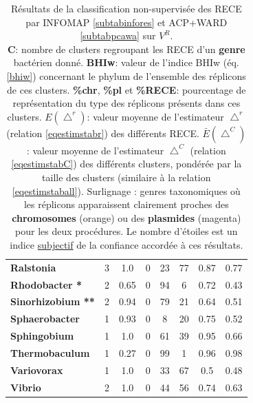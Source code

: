 \begin{landscape}
\begin{small}
\begin{table}[h]
\begin{minipage}[t]{0.45\linewidth}
\begin{tabular}{>{\bfseries}l|c|c|ccc|c|c}
Ralstonia&3&1.0&0&23&77&0.87&0.77\\
\rowcolor{Cpl}Rhodobacter *&2&0.65&0&94&6&0.72&0.43\\
\rowcolor{Cpl}Sinorhizobium **&2&0.94&0&79&21&0.64&0.51\\
Sphaerobacter&1&0.93&0&8&20&0.75&0.52\\
Sphingobium&1&1.0&0&61&39&0.95&0.66\\
Thermobaculum&1&0.27&0&99&1&0.96&0.98\\
Variovorax&1&1.0&0&33&67&0.5&0.48\\
Vibrio&2&1.0&0&44&56&0.74&0.63\\
	  \end{tabular}
	  \label{subtabpcawa}
	  \end{minipage}
	  \caption[Classification non-supervisée des RECE]{Résultats de la classification non-supervisée des RECE par INFOMAP \ref{subtabinfores} et ACP+WARD \ref{subtabpcawa} sur $V^{R}$. \\
 \textbf{C}: nombre de clusters regroupant les RECE d'un \textbf{genre} bactérien donné. \textbf{BHIw}: valeur de l'indice BHIw (éq. \ref{bhiw}) concernant le phylum de l'ensemble des réplicons de ces clusters. \textbf{\%chr}, \textbf{\%pl} et \textbf{\%RECE}: pourcentage de représentation du type des réplicons présents dans ces clusters. $E(\bigtriangleup^{r})$: valeur moyenne de l'estimateur $\bigtriangleup^{r}$ (relation \ref{eqestimstabr}) des différents RECE. $\bar{E}(\bigtriangleup^{C})$: valeur moyenne de l'estimateur $\bigtriangleup^{C}$ (relation \ref{eqestimstabC}) des différents clusters, pondérée par la taille des clusters (similaire à la relation \ref{eqestimstaball}). Surlignage : genres taxonomiques où les réplicons apparaissent clairement proches des \textbf{chromosomes} (orange) ou des \textbf{plasmides} (magenta) pour les deux procédures. Le nombre d'étoiles est un indice \underline{subjectif} de la confiance accordée à ces résultats.}\label{tabrececluster}
	  \end{table}
	  \end{small}
	 \end{landscape}
	  
	     